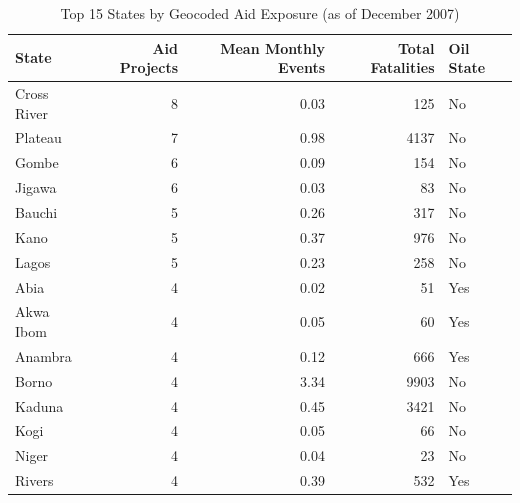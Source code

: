 \begin{table}[ht]
\centering
\begin{tabular}{lrrrl}
  \toprule
State & Aid Projects & Mean Monthly Events & Total Fatalities & Oil State \\ 
  \midrule
Cross River &   8 & 0.03 & 125 & No \\ 
  Plateau &   7 & 0.98 & 4137 & No \\ 
  Gombe &   6 & 0.09 & 154 & No \\ 
  Jigawa &   6 & 0.03 &  83 & No \\ 
  Bauchi &   5 & 0.26 & 317 & No \\ 
  Kano &   5 & 0.37 & 976 & No \\ 
  Lagos &   5 & 0.23 & 258 & No \\ 
  Abia &   4 & 0.02 &  51 & Yes \\ 
  Akwa Ibom &   4 & 0.05 &  60 & Yes \\ 
  Anambra &   4 & 0.12 & 666 & Yes \\ 
  Borno &   4 & 3.34 & 9903 & No \\ 
  Kaduna &   4 & 0.45 & 3421 & No \\ 
  Kogi &   4 & 0.05 &  66 & No \\ 
  Niger &   4 & 0.04 &  23 & No \\ 
  Rivers &   4 & 0.39 & 532 & Yes \\ 
   \bottomrule
\end{tabular}
\caption{Top 15 States by Geocoded Aid Exposure (as of December 2007)} 
\label{tab:state_descriptives}
\end{table}
